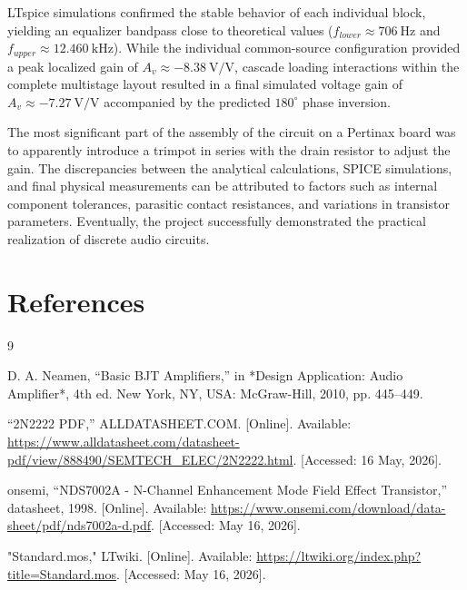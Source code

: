 \documentclass[12pt, a4paper]{article}
\numberwithin{table}{section}
\numberwithin{figure}{section}
\begin{document}
LTspice simulations confirmed the stable behavior of each individual block, yielding an equalizer bandpass close to theoretical values ($f_{lower}\approx706~\mathrm{Hz}$ and $f_{upper}\approx12.460~\mathrm{kHz}$). While the individual common-source configuration provided a peak localized gain of $A_v\approx-8.38~\mathrm{V/V}$, cascade loading interactions within the complete multistage layout resulted in a final simulated voltage gain of $A_v\approx-7.27~\mathrm{V/V}$ accompanied by the predicted $180^\circ$ phase inversion.

The most significant part of the assembly of the circuit on a Pertinax board was to apparently introduce a trimpot in series with the drain resistor to adjust the gain. The discrepancies between the analytical calculations, SPICE simulations, and final physical measurements can be attributed to factors such as internal component tolerances, parasitic contact resistances, and variations in transistor parameters. Eventually, the project successfully demonstrated the practical realization of discrete audio circuits.

\section{References}

\vspace{-3em}

\begin{thebibliography}{9}

D. A. Neamen, “Basic BJT Amplifiers,” in *Design Application: Audio Amplifier*, 4th ed. New York, NY, USA: McGraw-Hill, 2010, pp. 445–449.

“2N2222 PDF,” ALLDATASHEET.COM. [Online]. Available: \href{https://www.alldatasheet.com/datasheet-pdf/view/888490/SEMTECH_ELEC/2N2222.html}{\url{https://www.alldatasheet.com/datasheet-pdf/view/888490/SEMTECH_ELEC/2N2222.html}}. [Accessed: 16 May, 2026].


onsemi, “NDS7002A - N-Channel Enhancement Mode Field Effect Transistor,” datasheet, 1998. [Online]. Available: \href{https://www.onsemi.com/download/data-sheet/pdf/nds7002a-d.pdf}{\url{https://www.onsemi.com/download/data-sheet/pdf/nds7002a-d.pdf}}. [Accessed: May 16, 2026].

"Standard.mos," LTwiki. [Online]. Available: \href{https://ltwiki.org/index.php?title=Standard.mos}{\url{https://ltwiki.org/index.php?title=Standard.mos}}. [Accessed: May 16, 2026].
\end{thebibliography}
\end{document}
